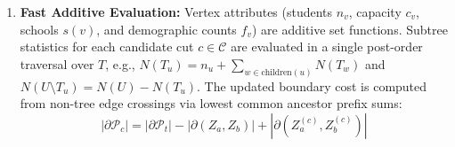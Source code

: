 \documentclass{article}
\begin{document}
\begin{enumerate}
    Orientations that violate designated centroid anchoring ($c_a \notin Z_a'$ or $c_b \notin Z_b'$) or explicit vertex candidate restrictions are pruned, producing a legal candidate cut pool $\mathcal{C}$.
    \item \textbf{Fast Additive Evaluation:} Vertex attributes (students $n_v$, capacity $c_v$, schools $s(v)$, and demographic counts $f_v$) are additive set functions. Subtree statistics for each candidate cut $c \in \mathcal{C}$ are evaluated in a single post-order traversal over $T$, e.g., $N(T_u) = n_u + \sum_{w \in \text{children}(u)} N(T_w)$ and $N(U \setminus T_u) = N(U) - N(T_u)$. The updated boundary cost is computed from non-tree edge crossings via lowest common ancestor prefix sums:
    \begin{equation}
    |\partial \mathcal{P}_c| = |\partial \mathcal{P}_t| - |\partial(Z_a, Z_b)| + |\partial(Z_a^{(c)}, Z_b^{(c)})|
    \end{equation}
\end{enumerate}
\end{document}
